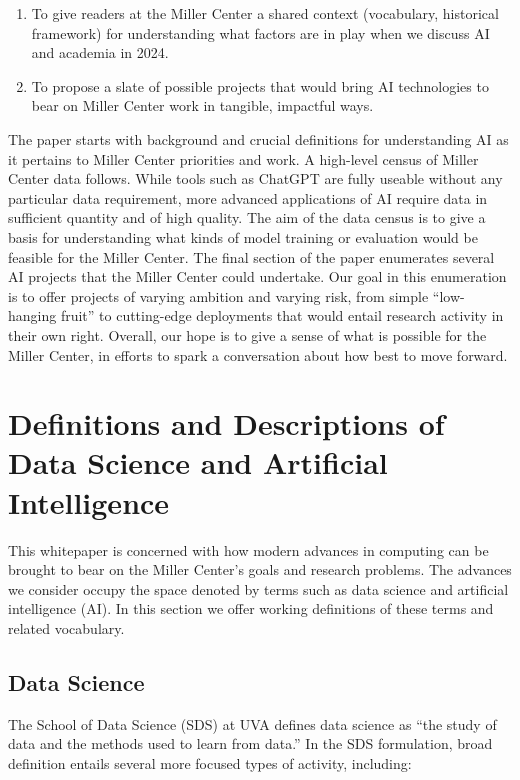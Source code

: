 \documentclass[12pt, oneside]{article}   	%
\begin{document}
\begin{enumerate}
\item To give readers at the Miller Center a shared context (vocabulary, historical framework) for understanding what factors are in play when we discuss AI and academia in 2024.
\item To propose a slate of possible projects that would bring AI technologies to bear on Miller Center work in tangible, impactful ways.
\end{enumerate}


The paper starts with background and crucial definitions for understanding AI as it pertains to Miller Center priorities and work.  A high-level census of Miller Center data follows.  While tools such as ChatGPT are fully useable without any particular data requirement, more advanced applications of AI require data in sufficient quantity and of high quality.  The aim of the data census is to give a basis for understanding what kinds of model training or evaluation would be feasible for the Miller Center.  The final section of the paper enumerates several AI projects that the Miller Center could undertake.  Our goal in this enumeration is to offer projects of varying ambition and varying risk, from simple “low-hanging fruit” to cutting-edge deployments that would entail research activity in their own right.  Overall, our hope is to give a sense of what is possible for the Miller Center, in efforts to spark a conversation about how best to move forward.


\section{Definitions and Descriptions of Data Science and Artificial Intelligence}\label{section.definitions}
This whitepaper is concerned with how modern advances in computing can be brought to bear on the Miller Center’s goals and research problems.  The advances we consider occupy the space denoted by terms such as data science and artificial intelligence (AI).  In this section we offer working definitions of these terms and related vocabulary.

\subsection{Data Science}\label{section.definitions.data-science}
The School of Data Science (SDS) at UVA defines data science as “the study of data and the methods used to learn from data.” \cite{sds:2023}  In the SDS formulation, broad definition entails several more focused types of activity, including:
\end{document}

